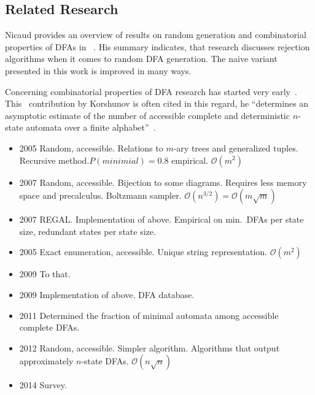 \subsection{Related Research}

Nicaud provides an overview of results on random generation and combinatorial properties of DFAs in ~\cite{Nic14}. His summary indicates, that research discusses rejection algorithms when it comes to random DFA generation. The naive variant presented in this work is improved in many ways. 

Concerning combinatorial properties of DFA research has started very early~\cite{Vys59}. This~\cite{Kor78} contribution by Korshunov is often cited in this regard, he ``determines an asymptotic estimate of the number of accessible complete and deterministic $n$-state automata over a finite alphabet''~\cite[p. 1]{BDS11}.

\begin{itemize}
    \item 2005 \cite{CP05} Random, accessible. Relations to $m$-ary trees and generalized tuples. Recursive method.$P(minimial) = 0.8$ empirical. $\mathcal{O}(m^2)$
    
    \item 2007 \cite{BN07} Random, accessible. Bijection to some diagrams. Requires less memory space and precalculus.  Boltzmann sampler. $\mathcal{O}(n^{3/2}) = \mathcal{O}(m\sqrt{m})$
    \item 2007 \cite{BDN07} REGAL. Implementation of above. Empirical on min.\ DFAs per state size, redundant states per state size.
    
    \item 2005 \cite{RMA05} Exact enumeration, accessible. Unique string representation. $\mathcal{O}(m^2)$
    \item 2009 \cite{AMR09} To that.
    \item 2009 \cite{AAA09} Implementation of above. DFA database.
    
    \item 2011 \cite{BDS11} Determined the fraction of minimal automata among accessible complete DFAs.
    
    \item 2012 \cite{CN12} Random, accessible. Simpler algorithm. Algorithms that output approximately $n$-state DFAs. $\mathcal{O}(n\sqrt{n})$
    
    \item 2014 \cite{Nic14} Survey.
\end{itemize}


